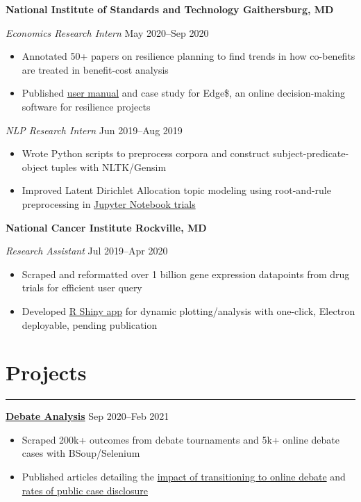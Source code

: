 \documentclass[11pt]{article}
\newcommand{\resumesection}[1]{\vspace{-0.6cm}\section*{\color{highlight}#1}\vspace{-0.3cm}\hrule\vspace{0.2cm}}
\begin{document}
\textbf{National Institute of Standards and Technology \hfill Gaithersburg, MD}\par

\textit{Economics Research Intern} \hfill May 2020--Sep 2020
\begin{itemize}
	\item Annotated 50+ papers on resilience planning to find trends in how co-benefits are treated in benefit-cost analysis
	\item Published \href{https://nvlpubs.nist.gov/nistpubs/SpecialPublications/NIST.SP.1260.pdf}{user manual} and case study for Edge\$, an online decision-making software for resilience projects
\end{itemize}\par


\textit{NLP Research Intern} \hfill Jun 2019--Aug 2019
\begin{itemize}
	\item Wrote Python scripts to preprocess corpora and construct subject-predicate-object tuples with NLTK/Gensim
	\item Improved Latent Dirichlet Allocation topic modeling using root-and-rule preprocessing in \href{https://github.com/petezh/RR-NLP-Tools}{Jupyter Notebook trials}
\end{itemize}\par

\textbf{National Cancer Institute \hfill Rockville, MD}\par

\textit{Research Assistant} \hfill Jul 2019--Apr 2020 \par
\begin{itemize}
	\item Scraped and reformatted over 1 billion gene expression datapoints from drug trials for efficient user query
	\item Developed \href{https://github.com/petezh/TP-Workbench}{R Shiny app} for dynamic plotting/analysis with one-click, Electron deployable, pending publication
\end{itemize}\par

\resumesection{Projects}

\textbf{\href{https://github.com/petezh/E-Debate}{Debate Analysis}} \hfill Sep 2020--Feb 2021\par
\begin{itemize}
	\item Scraped 200k+ outcomes from debate tournaments and 5k+ online debate cases with BSoup/Selenium
	\item Published articles detailing the \href{https://www.vbriefly.com/2020/12/31/five-trends-among-e-debate-competitors-by-peter-zhang/}{impact of transitioning to online debate} and \href{https://www.vbriefly.com/2021/01/22/disclosure-in-numbers-by-peter-zhang/}{rates of public case disclosure}
\end{itemize}\vspace{0.1cm} \par
\end{document}
